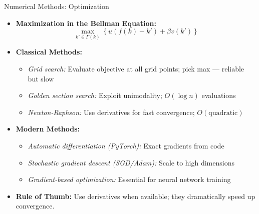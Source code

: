 \begin{frame}{Numerical Methods: Optimization}
\begin{itemize}
\item \textbf{Maximization in the Bellman Equation:}
\[
\max_{k' \in \Gamma(k)} \left\{ u(f(k) - k') + \beta v(k') \right\}
\]

\medskip
\item \textbf{Classical Methods:}
\begin{itemize}
    \item \emph{Grid search:} Evaluate objective at all grid points; pick max --- reliable but slow
    \item \emph{Golden section search:} Exploit unimodality; $O(\log n)$ evaluations
    \item \emph{Newton-Raphson:} Use derivatives for fast convergence; $O(\text{quadratic})$
\end{itemize}

\medskip
\item \textbf{Modern Methods:}
\begin{itemize}
    \item \emph{Automatic differentiation (PyTorch):} Exact gradients from code
    \item \emph{Stochastic gradient descent (SGD/Adam):} Scale to high dimensions
    \item \emph{Gradient-based optimization:} Essential for neural network training
\end{itemize}

\medskip
\item \textbf{Rule of Thumb:} Use derivatives when available; they dramatically speed up convergence.
\end{itemize}
\end{frame}

